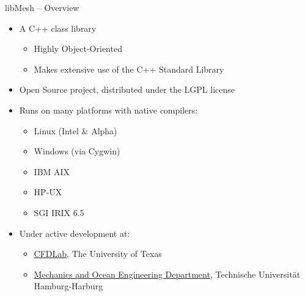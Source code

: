 \documentclass[landscape,pdftex,headrule,footrule]{foils}
\begin{document}
\begin{foil}[-.25in]{libMesh -- Overview}
  \begin{itemize}
    \tightlist
    \item A C++ class library
      \begin{itemize}
        \item Highly Object-Oriented
        \item Makes extensive use of the C++ Standard Library
      \end{itemize}
    \item Open Source project, distributed under the LGPL license
    \item Runs on many platforms with native compilers:
      \begin{itemize}
        \item Linux (Intel \& Alpha)
        \item Windows (via Cygwin)
        \item IBM AIX
        \item HP-UX
        \item SGI IRIX 6.5
      \end{itemize}
    \item Under active development at:
      \begin{itemize}
        \item \href{http://cfdlab.ae.utexas.edu}{CFDLab}, The University of Texas
        \item \href{http://www.mum.tu-harburg.de/english}{Mechanics and Ocean Engineering Department},
                    Technische Universit\"{a}t Hamburg-Harburg
      \end{itemize}
  \end{itemize}
\end{foil}
\end{document}
